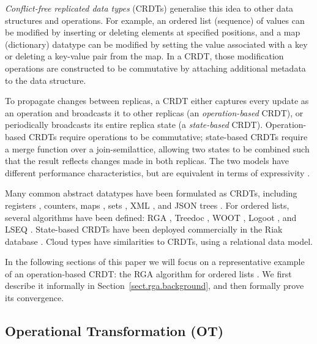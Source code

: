 \emph{Conflict-free replicated data types} (CRDTs) generalise this idea to other data structures and
operations. For example, an ordered list (sequence) of values can be modified by inserting or
deleting elements at specified positions, and a map (dictionary) datatype can be modified by setting
the value associated with a key or deleting a key-value pair from the map. In a CRDT, those
modification operations are constructed to be commutative by attaching additional metadata to the
data structure.

To propagate changes between replicas, a CRDT either captures every update as an operation and
broadcasts it to other replicas (an \emph{operation-based} CRDT), or periodically broadcasts its
entire replica state (a \emph{state-based} CRDT). Operation-based CRDTs require operations to be
commutative; state-based CRDTs require a merge function over a join-semilattice, allowing two states
to be combined such that the result reflects changes made in both replicas. The two models have
different performance characteristics, but are equivalent in terms of expressivity
\cite{Shapiro:2011wy,Shapiro:2011un}.

Many common abstract datatypes have been formulated as CRDTs, including
registers \cite{Shapiro:2011wy,Shapiro:2011un}, counters, maps \cite{Baquero:2016iv},
sets \cite{Bieniusa:2012wu,Bieniusa:2012gt}, XML \cite{Martin:2010ih},
and JSON trees \cite{Kleppmann:2016ve}. For ordered lists, several algorithms have been defined:
RGA \cite{Roh:2011dw}, Treedoc \cite{Preguica:2009fz}, WOOT \cite{Oster:2006wj},
Logoot \cite{Weiss:2010hx}, and LSEQ \cite{Nedelec:2013ky,Nedelec:2016eo}.
State-based CRDTs have been deployed commercially in the Riak database \cite{Brown:2014hs}.
Cloud types \cite{Burckhardt:2012jy} have similarities to CRDTs, using a relational data model.

In the following sections of this paper we will focus on a representative example of an
operation-based CRDT: the RGA algorithm for ordered lists \cite{Roh:2011dw}. We first describe it
informally in Section~\ref{sect.rga.background}, and then formally prove its convergence.

\subsection{Operational Transformation (OT)}\label{sect.related.ot}

